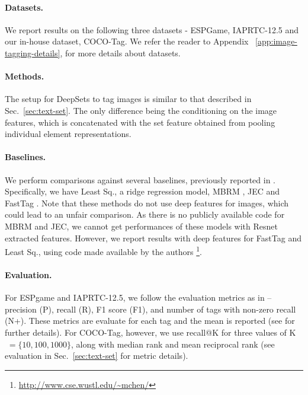 \documentclass{article}
\newcommand{\compactparagraph}[1]{\vspace*{-10pt}\paragraph{#1}}
\newcommand{\refsec}[1]{Sec.~\ref{#1}}
\newcommand{\refapp}[1]{Appendix ~\ref{#1}}
\newcommand{\deepsets}{DeepSets\xspace}
\begin{document}
\compactparagraph{Datasets.}
We report results on the following three datasets - ESPGame, IAPRTC-12.5 and our in-house dataset, COCO-Tag. We refer the reader to \refapp{app:image-tagging-details}, for more details about datasets.

\compactparagraph{Methods.}
The setup for \deepsets to tag images is similar to that described in \refsec{sec:text-set}.
The only difference being the conditioning on the image features, which is concatenated with the set feature obtained from pooling individual element representations.

\compactparagraph{Baselines.}
We perform comparisons against several baselines, previously reported in \cite{chen2013fast}. Specifically, we have Least Sq., a ridge regression model, MBRM \cite{Feng:2004:MBR:1896300.1896446}, JEC \cite{Makadia:2008:NBI:1478172.1478199} and FastTag \cite{chen2013fast}. Note that these methods do not use deep features for images, which could lead to an unfair comparison. As there is no publicly available code for MBRM and JEC, we cannot get performances of these models with Resnet extracted features. However, we report results with deep features for FastTag and Least Sq., using code made available by the authors \footnote{\url{http://www.cse.wustl.edu/~mchen/}}.

\compactparagraph{Evaluation.}
For ESPgame and IAPRTC-12.5, we follow the evaluation metrics as in \cite{guillaumin2009tagprop}--precision (P), recall (R), F1 score (F1), and number of tags with non-zero recall (N+).
These metrics are evaluate for each tag and the mean is reported (see \cite{guillaumin2009tagprop} for further details).
For COCO-Tag, however, we use recall@K for three values of K$\;=\{10, 100, 1000\}$, along with median rank and mean reciprocal rank (see evaluation in \refsec{sec:text-set} for metric details).
\end{document}
